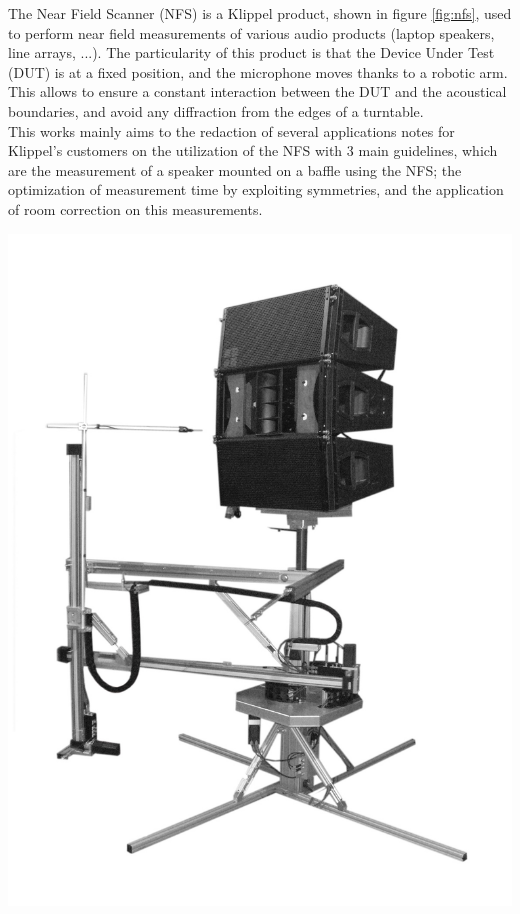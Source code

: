 \documentclass{report}
\begin{document}
\begin{minipage}{0.6\textwidth}
The Near Field Scanner (NFS) is a Klippel product, shown in figure \ref{fig:nfs}, used to perform near field measurements of various audio products (laptop speakers, line arrays, ...). The particularity of this product is that the Device Under Test (DUT) is at a fixed position, and the microphone moves thanks to a robotic arm. This allows to ensure a constant interaction between the DUT and the acoustical boundaries, and avoid any diffraction from the edges of a turntable. \\

This works mainly aims to the redaction of several applications notes for Klippel's customers on the utilization of the NFS with 3 main guidelines, which are the measurement of a speaker mounted on a baffle using the NFS; the optimization of measurement time by exploiting symmetries, and the application of room correction on this measurements.
\end{minipage}
\begin{minipage}{0.4\textwidth}
\begin{center}
	\includegraphics[scale=0.13]{Preface/NFS2} 
    \captionsetup{hypcap=false} 
	\label{fig:nfs}
\end{center}
\end{minipage}\newline
\end{document}
